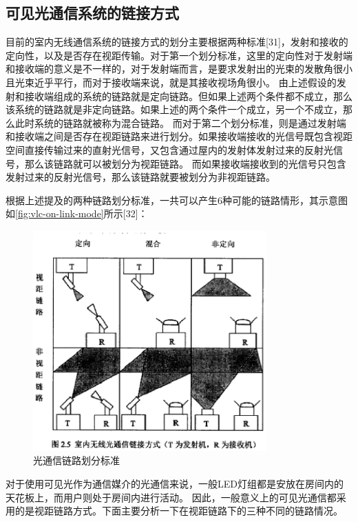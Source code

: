 \subsection{可见光通信系统的链接方式}\label{sec:vlc-on-link-mode}
目前的室内无线通信系统的链接方式的划分主要根据两种标准[31]，发射和接收的定向性，以及是否存在视距传输。对于第一个划分标准，这里的定向性对于发射端和接收端的意义是不一样的，对于发射端而言，是要求发射出的光束的发散角很小且光束近乎平行，而对于接收端来说，就是其接收视场角很小。
由上述假设的发射和接收端组成的系统的链路就是定向链路。但如果上述两个条件都不成立，那么该系统的链路就是非定向链路。如果上述的两个条件一个成立，另一个不成立，那么此时系统的链路就被称为混合链路。
而对于第二个划分标准，则是通过发射端和接收端之间是否存在视距链路来进行划分。如果接收端接收的光信号既包含视距空间直接传输过来的直射光信号，又包含通过屋内的发射体发射过来的反射光信号，那么该链路就可以被划分为视距链路。
而如果接收端接收到的光信号只包含发射过来的反射光信号，那么该链路就要被划分为非视距链路。

根据上述提及的两种链路划分标准，一共可以产生6种可能的链路情形，其示意图如\autoref{fig:vlc-on-link-mode}所示[32]：

\begin{figure}[htbp]
    \centering
	\includegraphics[width=0.8\textwidth]{figures/chapter-2/VlcOnLinkMode.eps}
	\caption{光通信链路划分标准}
	\label{fig:vlc-on-link-mode}
\end{figure}

对于使用可见光作为通信媒介的光通信来说，一般LED灯组都是安放在房间内的天花板上，而用户则处于房间内进行活动。
因此，一般意义上的可见光通信都采用的是视距链路方式。下面主要分析一下在视距链路下的三种不同的链路情况。

